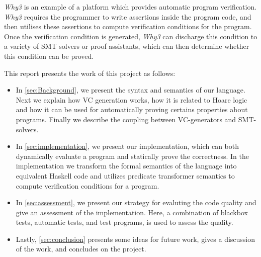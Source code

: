 

\textit{Why3} is an example of a platform which provides automatic program verification.
\textit{Why3} requires the programmer to write assertions inside the program code, and then utilises these assertions to compute verification conditions for the program.
Once the verification condition is generated, \textit{Why3} can discharge this condition to a variety of SMT solvers or proof assistants, which can then determine whether this condition can be proved.


This report presents the work of this project as follows:

\begin{itemize}
  \item In \cref{sec:Background}, we present the syntax and semantics of our language.
  Next we explain how VC generation works, how it is related to Hoare logic and how it can be used for automatically proving certains properties about programs. Finally we describe the coupling between VC-generators and SMT-solvers.
\item In \cref{sec:implementation}, we present our implementation, which can both dynamically evaluate a program and statically prove the correctness.
In the implementation we transform the formal semantics of the language into equivalent Haskell code and utilizes predicate transformer semantics to compute verification conditions for a program.
\item In \cref{sec:assessment}, we present our strategy for evaluting the code quality and give an assessment of the implementation.
 Here, a combination of blackbox tests, automatic tests, and test programs, is used to assess the quality.
\item Lastly, \cref{sec:conclusion} presents some ideas for future work, gives a discussion of the work, and concludes on the project.
\end{itemize}

